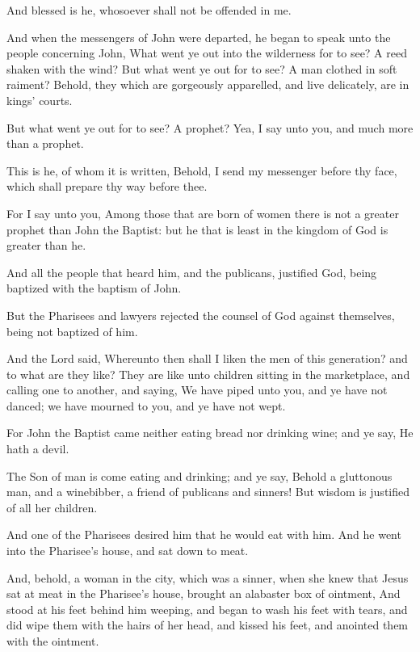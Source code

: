 \Verse And blessed is he, whosoever shall not be offended in me.

\Verse And when the messengers of John were departed, he began to speak unto the people concerning John, What went ye out into the wilderness for to see?  A reed shaken with the wind?  \Verse But what went ye out for to see? A man clothed in soft raiment?  Behold, they which are gorgeously apparelled, and live delicately, are in kings' courts.

\Verse But what went ye out for to see? A prophet? Yea, I say unto you, and much more than a prophet.

\Verse This is he, of whom it is written, Behold, I send my messenger before thy face, which shall prepare thy way before thee.

\Verse For I say unto you, Among those that are born of women there is not a greater prophet than John the Baptist: but he that is least in the kingdom of God is greater than he.

\Verse And all the people that heard him, and the publicans, justified God, being baptized with the baptism of John.

\Verse But the Pharisees and lawyers rejected the counsel of God against themselves, being not baptized of him.

\Verse And the Lord said, Whereunto then shall I liken the men of this generation? and to what are they like?  \Verse They are like unto children sitting in the marketplace, and calling one to another, and saying, We have piped unto you, and ye have not danced; we have mourned to you, and ye have not wept.

\Verse For John the Baptist came neither eating bread nor drinking wine; and ye say, He hath a devil.

\Verse The Son of man is come eating and drinking; and ye say, Behold a gluttonous man, and a winebibber, a friend of publicans and sinners!  \Verse But wisdom is justified of all her children.

\Verse And one of the Pharisees desired him that he would eat with him.  And he went into the Pharisee's house, and sat down to meat.

\Verse And, behold, a woman in the city, which was a sinner, when she knew that Jesus sat at meat in the Pharisee's house, brought an alabaster box of ointment, \Verse And stood at his feet behind him weeping, and began to wash his feet with tears, and did wipe them with the hairs of her head, and kissed his feet, and anointed them with the ointment.

